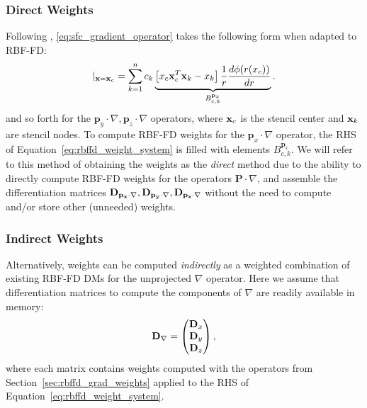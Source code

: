 \subsubsection{Direct Weights} 

Following \cite{FlyerLehto11}, \ref{eq:sfc_gradient_operator} takes the following form when adapted to RBF-FD:  
\begin{equation}
[ \mathbf{p}_{x} \cdot \nabla{f(\vx)}] |_{\vx = \vx_{c}} = \sum_{k=1}^{n} c_{k} \underbrace{\left[ x_{c} \vx_{c}^{T} \vx_{k} - x_{k} \right] \frac{1}{r} \d{\phi(r(x_{c}))}{r}}_{B_{c,k}^{\mathbf{p}_{x}}}. 
\label{eq:xsfc_operator_flyer_et_al}
\end{equation}
and so forth for the $\mathbf{p}_{y} \cdot \nabla, \mathbf{p}_{z}  \cdot \nabla$ operators, where $\mathbf{x}_{c}$ is the stencil center and $\mathbf{x}_{k}$ are stencil nodes. To compute RBF-FD weights for the $\mathbf{p}_{x} \cdot \nabla$ operator, the RHS of Equation~\ref{eq:rbffd_weight_system} is filled with elements $B_{c,k}^{\mathbf{p}_{x}}$. We will refer to this method of obtaining the weights as the \emph{direct} method due to the ability to directly compute RBF-FD weights for the operators $\mathbf{P} \cdot \nabla $, and assemble the differentiation matrices $\mathbf{D}_{\mathbf{p_{x}} \cdot \nabla}, \mathbf{D}_{\mathbf{p_{y}} \cdot \nabla}, \mathbf{D}_{\mathbf{p_{z}} \cdot \nabla}$ without the need to compute and/or store other (unneeded) weights.

\subsubsection{Indirect Weights} 

Alternatively, weights can be computed \emph{indirectly} as a weighted combination of existing RBF-FD DMs for the unprojected $\nabla$ operator. Here we assume that differentiation matrices to compute the components of $\nabla$ are readily available in memory: 
$$
\mathbf{D}_{\nabla} = \begin{pmatrix} \mathbf{D}_{x} \\ \mathbf{D}_{y} \\ \mathbf{D}_{z} \end{pmatrix},
$$
where each matrix contains weights computed with the operators from Section~\ref{sec:rbffd_grad_weights} applied to the RHS of Equation~\ref{eq:rbffd_weight_system}.  

